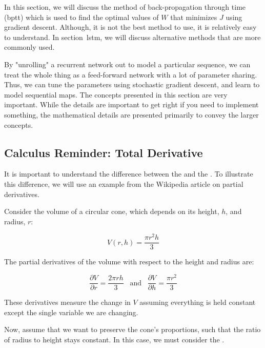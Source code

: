         In this section, we will discuss the method of back-propagation through time ({\sc bptt}) which is used to find the optimal values of $W$ that minimizes $J$ using gradient descent. Although, it is not the best method to use, it is relatively easy to understand. In section~lstm, we will discuss alternative methods that are more commonly used.
        
        \begin{concept}
        By "unrolling" a recurrent network out to model a particular sequence, we can treat the whole thing as a feed-forward network with a lot of parameter sharing. Thus, we can tune the parameters using stochastic gradient descent, and learn to model sequential maps. The concepts presented in this section are very important. While the details are important to get right if you need to implement something, the mathematical details are presented primarily to convey the larger concepts.
        \end{concept}
        
    \subsection{Calculus Reminder: Total Derivative}
    
    It is important to understand the difference between the  and the . To illustrate this difference, we will use an example from the Wikipedia article on partial derivatives.
    
    Consider the volume of a circular cone, which depends on its height, $h$, and radius, $r$:
    
    \begin{equation*}
    V(r, h) = \frac{\pi r^2 h}{3}
    \end{equation*}
    
    The partial derivatives of the volume with respect to the height and radius are:
    
    \begin{equation*}
    \frac{\partial V}{\partial r} = \frac{2\pi r h}{3}\;\;\;\text{and}\;\;\;
    \frac{\partial V}{\partial h} = \frac{\pi r^2}{3}
    \end{equation*}
    
    These derivatives measure the change in $V$ assuming everything is held constant except the single variable we are changing.
    
    Now, assume that we want to preserve the cone's proportions, such that the ratio of radius to height stays constant. In this case, we must consider the .
    
